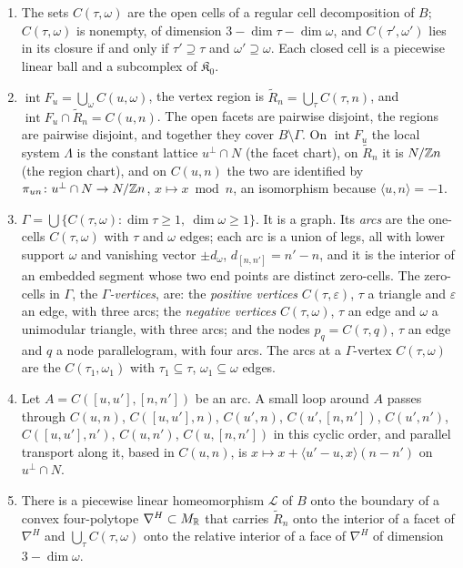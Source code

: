 \begin{enumerate}
\item[(D1)] The sets $C(\tau,\omega)$ are the open cells of a regular cell decomposition of $B$; $C(\tau,\omega)$ is
nonempty, of dimension $3-\dim\tau-\dim\omega$, and $C(\tau',\omega')$ lies in its closure if and only if
$\tau'\supseteq\tau$ and $\omega'\supseteq\omega$. Each closed cell is a piecewise linear ball and a subcomplex of
$\mathfrak K_0$.
\item[(D2)] $\operatorname{int}F_u=\bigcup_\omega C(u,\omega)$, the vertex region is $\widetilde R_n=\bigcup_\tau
C(\tau,n)$, and $\operatorname{int}F_u\cap\widetilde R_n=C(u,n)$. The open facets are pairwise disjoint, the regions
are pairwise disjoint, and together they cover $B\setminus\Gamma$. On $\operatorname{int}F_u$ the local system $\Lambda$
is the constant lattice $u^\perp\cap N$ (the facet chart), on $\widetilde R_n$ it is $N/\mathbb Z n$ (the region chart), and on
$C(u,n)$ the two are identified by $\pi_{un}\colon u^\perp\cap N\to N/\mathbb Z n$, $x\mapsto x\bmod n$, an isomorphism because
$\langle u,n\rangle=-1$.
\item[(D3)] $\Gamma=\bigcup\{C(\tau,\omega):\dim\tau\ge1,\ \dim\omega\ge1\}$. It is a graph. Its \emph{arcs} are the
one-cells $C(\tau,\omega)$ with $\tau$ and $\omega$ edges; each arc is a union of legs, all with lower support $\omega$ and
vanishing vector $\pm d_\omega$, $d_{[n,n']}=n'-n$, and it is the interior of an embedded segment whose two end points
are distinct zero-cells. The zero-cells in $\Gamma$, the \emph{$\Gamma$-vertices}, are: the \emph{positive vertices}
$C(\tau,\varepsilon)$, $\tau$ a triangle and $\varepsilon$ an edge, with three arcs; the \emph{negative vertices}
$C(\tau,\omega)$, $\tau$ an edge and $\omega$ a unimodular triangle, with three arcs; and the nodes
$p_q=C(\tau,q)$, $\tau$ an edge and $q$ a node parallelogram, with four arcs. The arcs at a $\Gamma$-vertex
$C(\tau,\omega)$ are the $C(\tau_1,\omega_1)$ with $\tau_1\subseteq\tau$, $\omega_1\subseteq\omega$ edges.
\item[(D4)] Let $A=C([u,u'],[n,n'])$ be an arc. A small loop around $A$ passes through
$C(u,n)$, $C([u,u'],n)$, $C(u',n)$, $C(u',[n,n'])$, $C(u',n')$, $C([u,u'],n')$, $C(u,n')$, $C(u,[n,n'])$ in this
cyclic order, and parallel transport along it, based in $C(u,n)$, is $x\mapsto x+\langle u'-u,x\rangle(n-n')$ on
$u^\perp\cap N$.
\item[(D5)] There is a piecewise linear homeomorphism $\mathcal L$ of $B$ onto the boundary of a convex four-polytope
$\nabla^H\subset M_\mathbb R$ that carries $\widetilde R_n$ onto the interior of a facet of $\nabla^H$ and
$\bigcup_\tau C(\tau,\omega)$ onto the relative interior of a face of $\nabla^H$ of dimension $3-\dim\omega$.
\end{enumerate}
